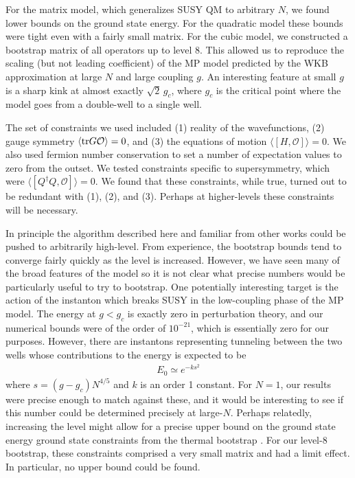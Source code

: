 \documentclass[a4paper,11pt]{article}
\newcommand{\tr}{{\rm {tr}}}
\numberwithin{equation}{section}
\begin{document}
For the matrix model, which generalizes SUSY QM to arbitrary $N$, we found lower bounds on the ground state energy. For the quadratic model these bounds were tight even with a fairly small matrix. For the cubic model, we constructed a bootstrap matrix of all operators up to level 8. This allowed us to reproduce the scaling (but not leading coefficient) of the MP model predicted by the WKB approximation at large $N$ and large coupling $g$. An interesting feature at small $g$ is a sharp kink at almost exactly $\sqrt{2} \,  g_c$, where $g_c$ is the critical point where the model goes from a double-well to a single well.

The set of constraints we used included (1) reality of the wavefunctions, (2) gauge symmetry $\langle \tr G \mathcal O \rangle = 0$, and (3) the equations of motion $\langle [H, \mathcal O] \rangle = 0$. We also used fermion number conservation to set a number of expectation values to zero from the outset. We tested constraints specific to supersymmetry, which were $\langle [Q^\dagger Q, \mathcal O] \rangle = 0$. We found that these constraints, while true, turned out to be redundant with (1), (2), and (3). Perhaps at higher-levels these constraints will be necessary.

In principle the algorithm described here and familiar from other works could be pushed to arbitrarily high-level. From experience, the bootstrap bounds tend to converge fairly quickly as the level is increased. However, we have seen many of the broad features of the model so it is not clear what precise numbers would be particularly useful to try to bootstrap. One potentially interesting target is the action of the instanton which breaks SUSY in the low-coupling phase of the MP model. The energy at $g < g_c$ is exactly zero in perturbation theory, and our numerical bounds were of the order of $10^{-21}$, which is essentially zero for our purposes. However, there are instantons representing tunneling between the two wells whose contributions to the energy is expected to be %
\begin{align}
    E_0 \simeq e^{-k s^2} 
\end{align}
%
where $s = (g - g_c) N^{4/5}$ and $k$ is an order 1 constant. For $N = 1$, our results were precise enough to match against these, and it would be interesting to see if this number could be determined precisely at large-$N$. Perhaps relatedly, increasing the level might allow for a precise upper bound on the ground state energy ground state constraints from the thermal bootstrap \cite{Fawzi:2023fpg, Cho:2024kxn}. For our level-8 bootstrap, these constraints comprised a very small matrix and had a limit effect. In particular, no upper bound could be found. 
\end{document}
